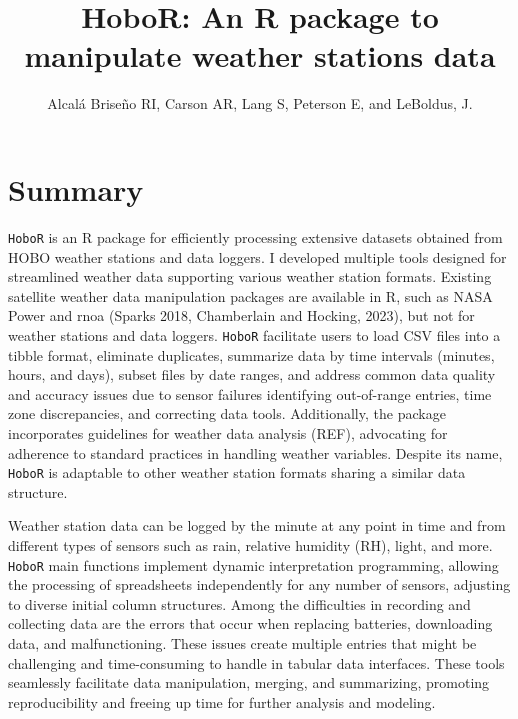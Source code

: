 \documentclass[11pt, oneside]{article}   	%
\title{HoboR: An R package to manipulate weather stations data}
\author{Alcal\'a Brise\~no RI, Carson AR, Lang S,  Peterson E,  and LeBoldus, J.}
\begin{document}
\maketitle
\section*{Summary}

\verb|HoboR| is an R package for efficiently processing extensive datasets obtained from HOBO weather stations and data loggers. I developed multiple tools designed for streamlined weather data supporting various weather station formats. Existing satellite weather data manipulation packages are available in R, such as NASA Power and rnoa (Sparks 2018, Chamberlain and Hocking, 2023), but not for weather stations and data loggers.  \verb|HoboR| facilitate users to load CSV files into a tibble format, eliminate duplicates, summarize data by time intervals (minutes, hours, and days), subset files by date ranges, and address common data quality and accuracy issues due to sensor failures identifying out-of-range entries, time zone discrepancies, and correcting data tools. Additionally, the package incorporates guidelines for weather data analysis (REF), advocating for adherence to standard practices in handling weather variables. Despite its name, \verb|HoboR| is adaptable to other weather station formats sharing a similar data structure.


Weather station data can be logged by the minute at any point in time and from different types of sensors such as rain, relative humidity (RH), light, and more. \verb|HoboR| main functions implement dynamic interpretation programming, allowing the processing of spreadsheets independently for any number of sensors, adjusting to diverse initial column structures. Among the difficulties in recording and collecting data are the errors that occur when replacing batteries, downloading data, and malfunctioning. These issues create multiple entries that might be challenging and time-consuming to handle in tabular data interfaces. These tools seamlessly facilitate data manipulation, merging, and summarizing, promoting reproducibility and freeing up time for further analysis and modeling.
\end{document}
